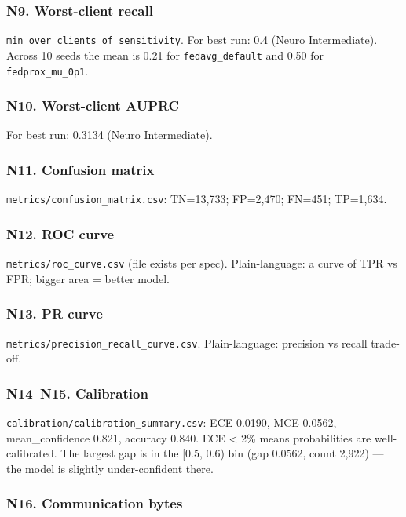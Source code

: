 \documentclass{article}
\begin{document}
\subsubsection{N9. Worst-client recall}


\texttt{min over clients of sensitivity}. For best run: 0.4 (Neuro Intermediate). Across 10 seeds the mean is 0.21 for \texttt{fedavg\_default} and 0.50 for \texttt{fedprox\_mu\_0p1}.


\subsubsection{N10. Worst-client AUPRC}


For best run: 0.3134 (Neuro Intermediate).


\subsubsection{N11. Confusion matrix}


\texttt{metrics/confusion\_matrix.csv}: TN=13,733; FP=2,470; FN=451; TP=1,634.


\subsubsection{N12. ROC curve}


\texttt{metrics/roc\_curve.csv} (file exists per spec). Plain-language: a curve of TPR vs FPR; bigger area = better model.


\subsubsection{N13. PR curve}


\texttt{metrics/precision\_recall\_curve.csv}. Plain-language: precision vs recall trade-off.


\subsubsection{N14--N15. Calibration}


\texttt{calibration/calibration\_summary.csv}: ECE 0.0190, MCE 0.0562, mean\_confidence 0.821, accuracy 0.840. ECE < 2\% means probabilities are well-calibrated. The largest gap is in the [0.5, 0.6) bin (gap 0.0562, count 2,922) --- the model is slightly under-confident there.


\subsubsection{N16. Communication bytes}
\end{document}
